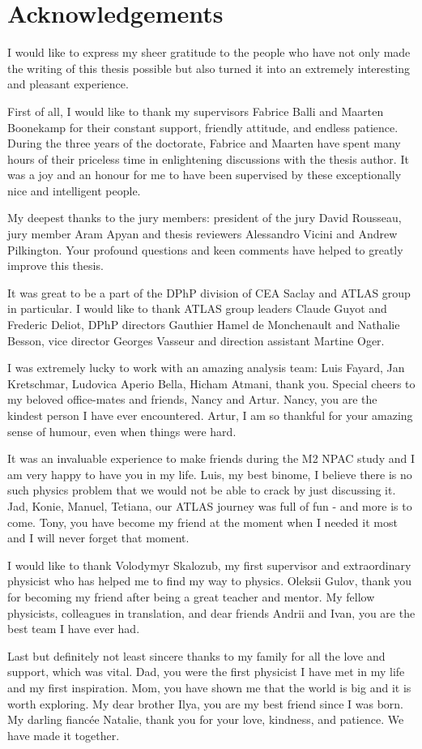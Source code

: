 \chapter*{Acknowledgements}

\vspace{-1cm}

I would like to express my sheer gratitude to the people who have not only made the writing of this thesis possible but also turned it into an extremely interesting and pleasant experience.

First of all, I would like to thank my supervisors Fabrice Balli and Maarten Boonekamp for their constant support, friendly attitude, and endless patience. During the three years of the doctorate, Fabrice and Maarten have spent many hours of their priceless time in enlightening discussions with the thesis author. It was a joy and an honour for me to have been supervised by these exceptionally nice and intelligent people.

My deepest thanks to the jury members: president of the jury David Rousseau, jury member Aram Apyan and thesis reviewers Alessandro Vicini and Andrew Pilkington. Your profound questions and keen comments have helped to greatly improve this thesis.

It was great to be a part of the DPhP division of CEA Saclay and ATLAS group in particular. I would like to thank ATLAS group leaders Claude Guyot and Frederic Deliot, DPhP directors Gauthier Hamel de Monchenault and Nathalie Besson, vice director Georges Vasseur and direction assistant Martine Oger.

I was extremely lucky to work with an amazing analysis team: Luis Fayard, Jan Kretschmar, Ludovica Aperio Bella, Hicham Atmani, thank you. Special cheers to my beloved office-mates and friends, Nancy and Artur. Nancy, you are the kindest person I have ever encountered. Artur, I am so thankful for your amazing sense of humour, even when things were hard.

It was an invaluable experience to make friends during the M2 NPAC study and I am very happy to have you in my life. Luis, my best binome, I believe there is no such physics problem that we would not be able to crack by just discussing it. Jad, Konie, Manuel, Tetiana, our ATLAS journey was full of fun - and more is to come. Tony, you have become my friend at the moment when I needed it most and I will never forget that moment.

I would like to thank Volodymyr Skalozub, my first supervisor and extraordinary physicist who has helped me to find my way to physics. Oleksii Gulov, thank you for becoming my friend after being a great teacher and mentor. My fellow physicists, colleagues in translation, and dear friends Andrii and Ivan, you are the best team I have ever had.

Last but definitely not least sincere thanks to my family for all the love and support, which was vital. Dad, you were the first physicist I have met in my life and my first inspiration. Mom, you have shown me that the world is big and it is worth exploring. My dear brother Ilya, you are my best friend since I was born. My darling fiancée Natalie, thank you for your love, kindness, and patience. We have made it together.
